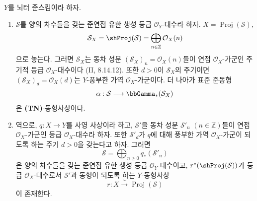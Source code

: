 \begin{proposition}[2.3.4]
\label{III.2.3.4-fr}
$Y$를 뇌터 준스킴이라 하자.
\begin{enumerate}
\item[{\rm(i)}] $\mathcal S$를 양의 차수들을 갖는 준연접 유한 생성
등급 $\mathcal O_Y$-대수라 하자. $X=\operatorname{Proj}(\mathcal S)$,
\[
\mathcal S_X=\shProj(\mathcal S)
=\bigoplus_{n\in\mathbb Z}\mathcal O_X(n)
\]
으로 놓는다. 그러면 $\mathcal S_X$는 동차 성분
$(\mathcal S_X)_n=\mathcal O_X(n)$들이 연접 $\mathcal O_X$-가군인
주기적 등급 $\mathcal O_X$-대수이다 (II, 8.14.12). 또한 $d>0$이
$\mathcal S_X$의 주기이면 $(\mathcal S_X)_d=\mathcal O_X(d)$는
$Y$-풍부한 가역 $\mathcal O_X$-가군이다. 더 나아가 표준 준동형
\[
\alpha:\mathcal S\longrightarrow\bbGamma_*(\mathcal S_X)
\]
은 \textbf{(TN)}-동형사상이다.
\item[{\rm(ii)}] 역으로, $q:X\to Y$를 사영 사상이라 하고,
$\mathcal S'$을 동차 성분 $\mathcal S'_n$ $(n\in\mathbb Z)$들이 연접
$\mathcal O_X$-가군인 등급 $\mathcal O_X$-대수라 하자. 또한
$\mathcal S'_d$가 $q$에 대해 풍부한 가역 $\mathcal O_X$-가군이
되도록 하는 주기 $d>0$을 갖는다고 하자. 그러면
\[
\mathcal S=\bigoplus_{n\geq0}q_*(\mathcal S'_n)
\]
은 양의 차수들을 갖는 준연접 유한 생성 등급 $\mathcal O_Y$-대수이고,
$r^*(\shProj(\mathcal S))$가 등급 $\mathcal O_X$-대수로서
$\mathcal S'$과 동형이 되도록 하는 $Y$-동형사상
\[
r:X\xrightarrow{\sim}\operatorname{Proj}(\mathcal S)
\]
이 존재한다.
\end{enumerate}
\end{proposition}

